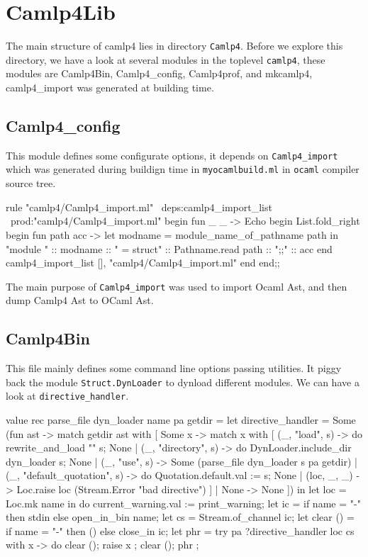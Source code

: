
\section{Camlp4Lib}
\label{sec:camlp4lib}

The main structure of camlp4 lies in directory \verb|Camlp4|. Before we
explore this directory, we have a look at several modules in the
toplevel \verb|camlp4|, these modules are Camlp4Bin, Camlp4\_config,
Camlp4prof, and mkcamlp4, camlp4\_import was generated at building time.


\subsection{Camlp4\_config}
This module defines some configurate options, it depends on
\verb|Camlp4_import| which was generated during buildign time
in \verb|myocamlbuild.ml| in \verb|ocaml| compiler source tree.

\begin{ocamlcode}
  rule "camlp4/Camlp4_import.ml"
  ~deps:camlp4_import_list
  ~prod:"camlp4/Camlp4_import.ml"
  begin fun _ _ ->
    Echo begin
      List.fold_right begin fun path acc ->
        let modname = module_name_of_pathname path in
        "module " :: modname :: " = struct\n" :: Pathname.read path :: "\nend;;\n" :: acc
      end camlp4_import_list [],
      "camlp4/Camlp4_import.ml"
    end
  end;;
\end{ocamlcode}

The main purpose of \verb|Camlp4_import| was used to import Ocaml Ast,
and then dump Camlp4 Ast to OCaml Ast.

\subsection{Camlp4Bin}
\label{Camlp4Bin}

This file mainly defines some command line options passing utilities.
It piggy back the module \verb|Struct.DynLoader| to dynload different
modules. We can have a look at \verb|directive_handler|.

\begin{ocamlcode}
 value rec parse_file dyn_loader name pa getdir =
  let directive_handler = Some (fun ast ->
    match getdir ast with
    [ Some x ->
        match x with
        [ (_, "load", s) -> do { rewrite_and_load "" s; None }
        | (_, "directory", s) -> do { DynLoader.include_dir dyn_loader s; None }
        | (_, "use", s) -> Some (parse_file dyn_loader s pa getdir)
        | (_, "default_quotation", s) -> do { Quotation.default.val := s; None }
        | (loc, _, _) -> Loc.raise loc (Stream.Error "bad directive") ]
    | None -> None ]) in
  let loc = Loc.mk name
  in do {
    current_warning.val := print_warning;
    let ic = if name = "-" then stdin else open_in_bin name;
    let cs = Stream.of_channel ic;
    let clear () = if name = "-" then () else close_in ic;
    let phr =
      try pa ?directive_handler loc cs
      with x -> do { clear (); raise x };
    clear ();
    phr
  };

\end{ocamlcode}



